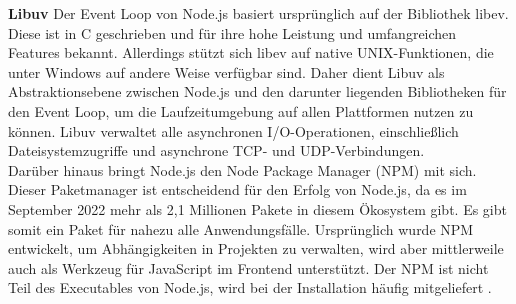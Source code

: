 \noindent
\textbf{Libuv} \newline
Der Event Loop von Node.js basiert ursprünglich auf der Bibliothek libev. Diese ist in C geschrieben und für ihre hohe Leistung und umfangreichen Features bekannt. Allerdings stützt sich libev auf native UNIX-Funktionen, die unter Windows auf andere Weise verfügbar sind. Daher dient Libuv als Abstraktionsebene zwischen Node.js und den darunter liegenden Bibliotheken für den Event Loop, um die Laufzeitumgebung auf allen Plattformen nutzen zu können. Libuv verwaltet alle asynchronen I/O-Operationen, einschließlich Dateisystemzugriffe und asynchrone TCP- und UDP-Verbindungen. \cite{Springer.2022} \\

\noindent
Darüber hinaus bringt Node.js den Node Package Manager (NPM) mit sich. Dieser Paketmanager ist entscheidend für den Erfolg von Node.js, da es im September 2022 mehr als 2,1 Millionen Pakete in diesem Ökosystem gibt. Es gibt somit ein Paket für nahezu alle Anwendungsfälle. Ursprünglich wurde NPM entwickelt, um Abhängigkeiten in Projekten zu verwalten, wird aber mittlerweile auch als Werkzeug für JavaScript im Frontend unterstützt. \cite{OpenJSFoundation.2022} Der NPM ist nicht Teil des Executables von Node.js, wird bei der Installation häufig mitgeliefert \cite{Springer.2022}.\\

